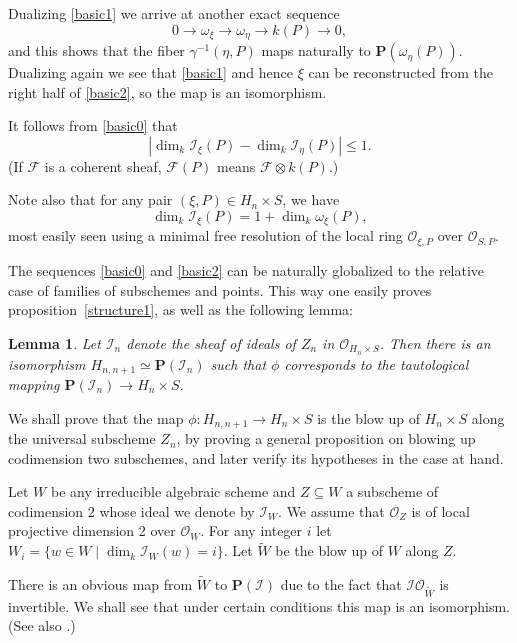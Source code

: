 \documentclass[12pt]{amsart}
\def\Hn{H_n}
\def\Hnn{H_{n,n+1}}
\let\:=\colon
\def\i{^{-1}}
\def\PP{{\mathbf P}}
\def\F{{\mathcal F}}
\def\I{{\mathcal I}}
\def\OO{{\mathcal O}}
\def\x{\times}
\def\*{\otimes}
\def\iso{\simeq}
\def\sub{\subseteq}
\def\tilde{\widetilde}
\newtheorem{lemma}[thm]{Lemma}
\theoremstyle{definition}
\theoremstyle{remark}
\numberwithin{equation}{section}
\newcommand{\propref}[1]{proposition~\ref{#1}}
\begin{document}
Dualizing \eqref{basic1} we arrive at another exact
sequence
\begin{equation}
  \label{basic2}
  0 \to \omega_{\xi} \to \omega_{\eta} \to k(P) \to 0,
\end{equation}
and this shows that the fiber $\gamma\i(\eta,P)$ maps naturally to
$\PP(\omega_{\eta}(P))$.  Dualizing again we see that \eqref{basic1}
and hence $\xi$ can be reconstructed from the right half of
\eqref{basic2}, so the map is an isomorphism.

It follows from \eqref{basic0} that
\begin{equation}
  \label{basic3}
  |\dim_k\I_{\xi}(P) - \dim_k\I_{\eta}(P)| \le 1.
\end{equation}
(If $\F$ is a coherent sheaf, $\F(P)$ means $\F\*k(P)$.)

Note also that for any pair $(\xi,P)\in
\Hn\x S$, we have
\begin{equation}
  \label{basic4}
  \dim_k \I_{\xi}(P) = 1+ \dim_k \omega_{\xi}(P),
\end{equation}
most easily seen using a minimal free resolution of the local ring
$\OO_{\xi,P}$ over $\OO_{S,P}$.

The sequences \eqref{basic0} and \eqref{basic2} can be naturally
globalized to the relative case of families of subschemes and points.
This way one easily proves \propref{structure1}, as well as the
following lemma:


 \begin{lemma}\label{philemma}
   Let $\I_n$ denote the sheaf of ideals of $Z_n$ in $\OO_{\Hn\times
     S}$.  Then there is an isomorphism $\Hnn\iso\PP(\I_n)$ such that
   $\phi$ corresponds to the tautological mapping $\PP(\I_n)\to
   \Hn\times S$.
 \end{lemma}

 We shall prove that the map $\phi\:\Hnn\to \Hn \times S$ is the blow
 up of $\Hn \times S$ along the universal subscheme $Z_n$, by proving
 a general proposition on blowing up codimension two subschemes, and
 later verify its hypotheses in the case at hand.

 Let $W$ be any irreducible algebraic scheme and $Z\sub W$ a subscheme
 of codimension $2$ whose ideal we denote by $\I_{W}$.  We assume that
 $\OO_{Z}$ is of local projective dimension 2 over $\OO_{W}$.  For any
 integer $i$ let $W_{i}=\{w\in W \mid \dim_k\I_{W}(w) = i\}$.  Let
 $\tilde W$ be the blow up of $W$ along $Z$.

 There is an obvious map from $\tilde W$ to $\PP(\I)$ due to the fact
 that $\I\OO_{\tilde W}$ is invertible.  We shall see that under
 certain conditions this map is an isomorphism. (See also
 \cite[Prop.~9]{Avramov}.)
\end{document}
